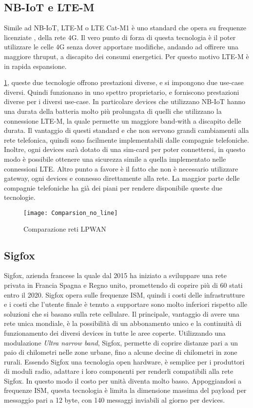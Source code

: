 \subsection{NB-IoT e LTE-M}
Simile ad NB-IoT, LTE-M o LTE Cat-M1  è uno standard che opera su frequenze 
licenziate , della rete 4G. Il vero punto di forza di questa tecnologia è il
poter utilizzare le celle 4G senza dover apportare modifiche, andando ad
offirere una maggiore thruput, a discapito dei consumi energetici. Per questo motivo
LTE-M è in rapida espansione. 

\ref{fig:comparazione_reti}, queste due tecnologie offrono prestazioni diverse,
e si impongono due use-case diversi.
Quindi funzionano in uno spettro proprietario, e forniscono prestazioni diverse
per i diversi use-case. In particolare devices che utilizzano NB-IoT hanno una
durata della batteria molto più prolungata di quelli che utilizzano la
connessione LTE-M, la quale permette un maggiore band-with a discapito delle
durata. Il vantaggio di questi standard e che non servono grandi cambiamenti
alla rete telefonica, quindi sono facilmente implementabili dalle compagnie
telefoniche. Inoltre, ogni devices sarà dotato di una sim-card per poter
connettersi, in questo modo è possibile ottenere  una sicurezza simile a quella
implementato nelle connessioni LTE.
Altro punto a favore è il fatto che non è necessario utilizzare gateway, ogni
devices e connesso direttamente alla rete. 
La maggior parte delle compagnie telefoniche ha già dei piani per rendere disponibile queste due
tecnologie.

\begin{figure}[h]
        \centering 
                \texttt{[image: Comparsion\_no\_line]}
        \caption{Comparazione reti LPWAN}
        \label{fig:comparazione_reti}
\end{figure}

\subsection{Sigfox}
Sigfox, azienda francese la quale dal 2015 ha iniziato a sviluppare una rete
privata in Francia Spagna e Regno unito, promettendo di coprire più di 60 stati
entro il 2020. Sigfox opera sulle frequenze ISM, quindi i costi delle
infrastrutture e i costi che l'utente finale è tenuto a supportare sono molto
inferiori rispetto alle soluzioni che si basano sulla rete cellulare. Il principale,
vantaggio di avere una rete unica mondiale, è la possibilità di un abbonamento unico e la
continuità di funzionamento dei diversi devices in tutte le aree coperte.
Utilizzando una modulazione \emph{Ultra narrow band}, Sigfox, permette di
coprire distanze pari a un paio di chilometri nelle zone urbane, fino a alcune
decine di chilometri in zone rurali. Essendo Sigfox una tecnologia
open hardware, è semplice per i produttori di moduli radio, adattare i loro
componenti per renderli compatibili alla rete Sigfox. In questo modo il costo
per unità diventa molto basso.
Appoggiandosi a frequenze ISM, questa tecnologia è limita la dimensione massima
del payload per messaggio pari a 12 byte, con 140 messaggi inviabili al giorno
per devices.

